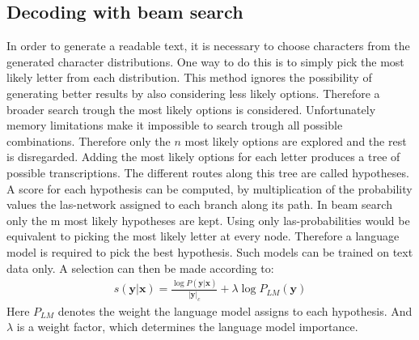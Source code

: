 \subsection{Decoding with beam search}
In order to generate a readable text, it is necessary to choose characters from the generated character distributions. One way to do this is to simply pick the most likely letter from each distribution. This method ignores the possibility of generating better results by also considering less likely options. Therefore a broader search trough the most likely options is considered. Unfortunately memory limitations make it impossible to search trough all possible combinations. Therefore only the $n$ most likely options are explored and the rest is disregarded. Adding the most likely options for each letter produces a tree of possible transcriptions. The different routes along this tree are called hypotheses. A score for each hypothesis can be computed, by multiplication of the probability values the las-network assigned to each branch along its path. In beam search only the m most likely hypotheses are kept. Using only las-probabilities would be equivalent to picking the most likely letter at every node. Therefore a language model is required to pick the best hypothesis. Such models can be trained on text data only. A selection can then be made according to\cite[page 6]{Chan2015}:
\begin{align}
s(\mathbf{y}|\mathbf{x}) = \frac{\log P(\mathbf{y}|\mathbf{x})}{ |\mathbf{y}|_c} + \lambda \log P_{LM}(\mathbf{y})
\end{align}
Here $P_{LM}$ denotes the weight the language model assigns to each hypothesis. And $\lambda$ is a weight factor, which determines the language model importance.

